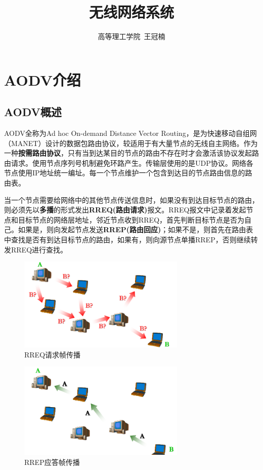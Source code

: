 \documentclass[a4paper]{article}
\title{无线网络系统}
\author{高等理工学院\ 王冠楠}
\date{}
\begin{document}
\maketitle

\section{AODV介绍}
\subsection{AODV概述}
AODV全称为Ad hoc On-demand Distance Vector Routing，是为快速移动自组网（MANET）设计的数据包路由协议，较适用于有大量节点的无线自主网络。作为一种\textbf{按需路由协议}，只有当到达某目的节点的路由不存在时才会激活该协议发起路由请求。使用节点序列号机制避免环路产生。传输层使用的是UDP协议。网络各节点使用IP地址统一编址。每一个节点维护一个包含到达目的节点路由信息的路由表。

当一个节点需要给网络中的其他节点传送信息时，如果没有到达目标节点的路由，则必须先以\textbf{多播}的形式发出\textbf{RREQ(路由请求)}报文。RREQ报文中记录着发起节点和目标节点的网络层地址，邻近节点收到RREQ，首先判断目标节点是否为自己。如果是，则向发起节点发送\textbf{RREP(路由回应)}；如果不是，则首先在路由表中查找是否有到达目标节点的路由，如果有，则向源节点单播RREP，否则继续转发RREQ进行查找。
\begin{figure}[htbp]
	\centering
	\includegraphics[width=8cm]{1.png}
	\caption{RREQ请求帧传播}
\end{figure}
\begin{figure}[htbp]
	\centering
	\includegraphics[width=8cm]{2.png}
	\caption{RREP应答帧传播}
\end{figure}
\end{document}
